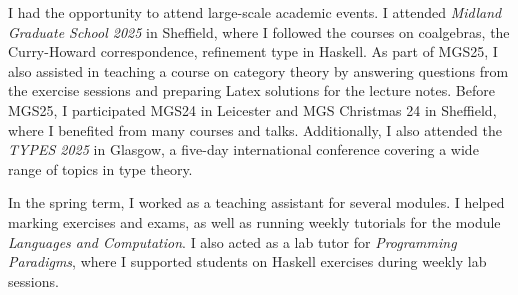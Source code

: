 I had the opportunity to attend large-scale academic events. I attended \textit{Midland Graduate School 2025} in Sheffield, where I followed the courses on coalgebras, the Curry-Howard correspondence, refinement type in Haskell. As part of MGS25, I also assisted in teaching a course on category theory by answering questions from the exercise sessions and preparing Latex solutions for the lecture notes. Before MGS25, I participated MGS24 in Leicester and MGS Christmas 24 in Sheffield, where I benefited from many courses and talks. Additionally, I also attended the \textit{TYPES 2025} in Glasgow, a five-day international conference covering a wide range of topics in type theory.

In the spring term, I worked as a teaching assistant for several modules. I helped marking exercises and exams, as well as running weekly tutorials for the module \textit{Languages and Computation}. I also acted as a lab tutor for \textit{Programming Paradigms}, where I supported students on Haskell exercises during weekly lab sessions.